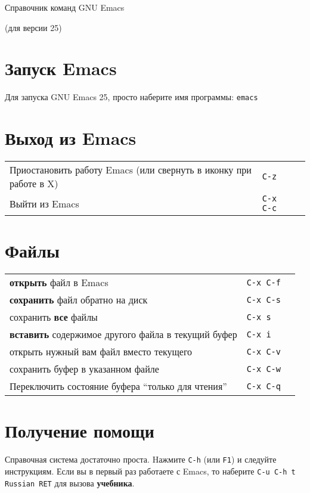 \documentclass[10pt]{article}
\newlength{\ColWidth}
\newlength{\ColThreeWidth}
\newcommand{\versionemacs}[0]{25} %
\newcommand{\kbd}[1]{\texttt{#1}}
\begin{document}

\centerline{Справочник команд GNU Emacs}
\centerline{(для версии \versionemacs)}

\section{Запуск Emacs}

Для запуска GNU Emacs \versionemacs, просто наберите имя программы: \kbd{emacs}

\section{Выход из Emacs}

\begin{tabular}{p{\ColWidth}p{\ColThreeWidth}p{\ColThreeWidth}}
Приостановить работу Emacs (или свернуть в иконку при работе в X) & \kbd{C-z} \\
Выйти из Emacs & \kbd{C-x C-c} \\
\end{tabular}

\section{Файлы}

\begin{tabular}{p{\ColWidth}p{\ColThreeWidth}p{\ColThreeWidth}}
{\bf открыть} файл в Emacs & \kbd{C-x C-f} \\
{\bf сохранить} файл обратно на диск & \kbd{C-x C-s} \\
сохранить {\bf все} файлы & \kbd{C-x s} \\
{\bf вставить} содержимое другого файла в текущий буфер & \kbd{C-x i} \\
открыть нужный вам файл вместо текущего & \kbd{C-x C-v} \\
сохранить буфер в указанном файле & \kbd{C-x C-w} \\
Переключить состояние буфера ``только для чтения'' & \kbd{C-x C-q} \\
\end{tabular}

\section{Получение помощи}

Справочная система достаточно проста. Hажмите \kbd{C-h} (или \kbd{F1}) и
следуйте инструкциям.  Если вы в первый раз работаете с Emacs, то наберите
\kbd{C-u C-h t Russian RET} для вызова {\bf учебника}.
\end{document}
